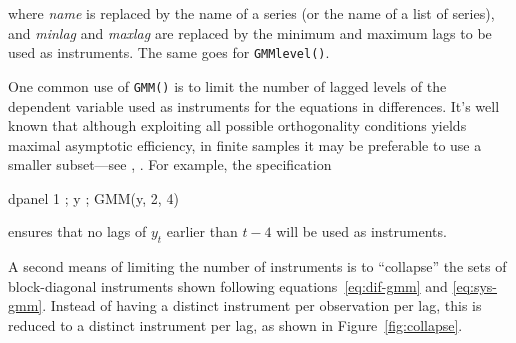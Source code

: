 \noindent
where \textsl{name} is replaced by the name of a series (or the name
of a list of series), and \textsl{minlag} and \textsl{maxlag} are
replaced by the minimum and maximum lags to be used as
instruments. The same goes for \texttt{GMMlevel()}.

One common use of \texttt{GMM()} is to limit the number of lagged
levels of the dependent variable used as instruments for the equations
in differences. It's well known that although exploiting all possible
orthogonality conditions yields maximal asymptotic efficiency, in
finite samples it may be preferable to use a smaller subset---see
\cite{Roodman2009a}, \cite{OkuiJoE2009}.  For example, the
specification

\begin{code}
  dpanel 1 ; y ; GMM(y, 2, 4)
\end{code}
ensures that no lags of $y_t$ earlier than $t-4$ will be used as
instruments.

A second means of limiting the number of instruments is to
``collapse'' the sets of block-diagonal instruments shown following
equations~\ref{eq:dif-gmm} and \ref{eq:sys-gmm}. Instead of having a
distinct instrument per observation per lag, this is reduced to a
distinct instrument per lag, as shown in Figure~\ref{fig:collapse}.

